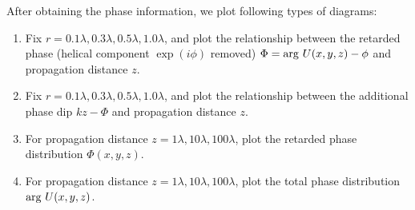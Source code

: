 After obtaining the phase information, we plot following types of diagrams:
\begin{enumerate}
	\item Fix $r = 0.1 \lambda, 0.3 \lambda, 0.5\lambda, 1.0 \lambda$, and plot the relationship between the retarded phase (helical component $\exp(i \phi)$ removed) $\Phi = {\rm arg}~ U(x, y, z) - \phi$ and propagation distance $z$.
	\item  Fix $r = 0.1 \lambda, 0.3 \lambda, 0.5 \lambda, 1.0 \lambda$, and plot the relationship between the additional phase dip $kz - \Phi$ and propagation distance $z$.
	\item For propagation distance $z = 1\lambda, 10 \lambda, 100 \lambda$, plot the retarded phase distribution $\Phi(x, y, z)$.
	\item For propagation distance $z = 1\lambda, 10 \lambda, 100 \lambda$, plot the total phase distribution ${\rm arg}~ U(x, y, z)$.
\end{enumerate}